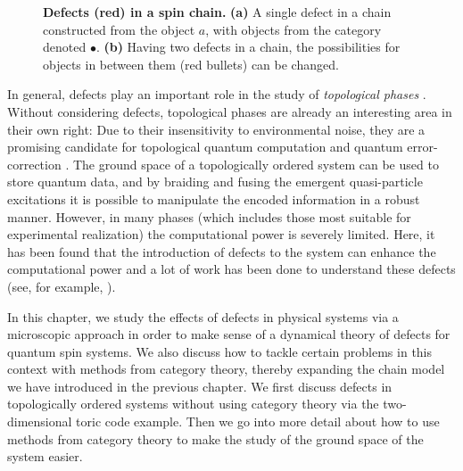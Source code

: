 \begin{figure}[H]
		\caption{\small \label{fig:defect} \textbf{Defects (red) in a spin chain.} \textbf{(a)} A single defect in a chain constructed from the object $a$, with objects from the category denoted $\bullet$. \textbf{(b)} Having two defects in a chain, the possibilities for objects in between them (red bullets) can be changed.}
	\end{figure}

In general, defects play an important role in the study of \emph{topological phases} \cite{Wen1990a,Wen1990b}. Without considering defects, topological phases are already an interesting area in their own right: Due to their insensitivity to environmental noise, they are a promising candidate for topological quantum computation and quantum error-correction \cite{Dennis2002,Kitaev2003,Nayak2008,Terhal2015,Pastawski2015,Brown2016}. The ground space of a topologically ordered system can be used to store quantum data, and by braiding and fusing the emergent quasi-particle excitations it is possible to manipulate the encoded information in a robust manner. However, in many phases (which includes those most suitable for experimental realization) the computational power is severely limited. Here, it has been found that the introduction of defects to the system can enhance the computational power and a lot of work has been done to understand these defects (see, for example, \cite{Fuchs2013,Barkeshli2013,Cong2016,Bridgeman2017,Cong2017,Kesselring2018}).

In this chapter, we study the effects of defects in physical systems via a microscopic approach in order to make sense of a dynamical theory of defects for quantum spin systems. We also discuss how to tackle certain problems in this context with methods from category theory, thereby expanding the chain model we have introduced in the previous chapter. We first discuss defects in topologically ordered systems without using category theory via the two-dimensional toric code example. Then we go into more detail about how to use methods from category theory to make the study of the ground space of the system easier. 

